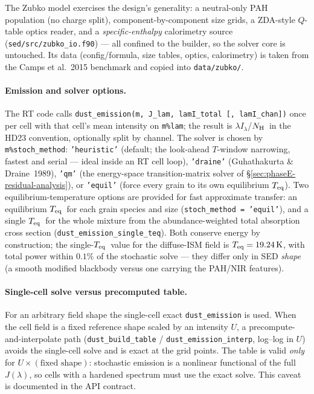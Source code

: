 \documentclass{my_memo}
\newcommand{\Teq}{\ensuremath{T_{\rm eq}}}
\newcommand{\Nh}{\ensuremath{N_{\rm H}}}
\newcommand{\lamIlam}{\ensuremath{\lambda I_\lambda}}
\begin{document}
\noindent The Zubko model exercises the design's generality: a neutral-only
PAH population (no charge split), component-by-component size grids, a ZDA-style
$Q$-table optics reader, and a \emph{specific-enthalpy} calorimetry source
(\texttt{sed/src/zubko\_io.f90}) --- all confined to the builder, so the
solver core is untouched. Its data (config/formula, size tables, optics,
calorimetry) is taken from the Camps et al.~2015 benchmark and copied into
\texttt{data/zubko/}.

\paragraph{Emission and solver options.} The RT code calls
\texttt{dust\_emission(m, J\_lam, lamI\_total [, lamI\_chan])} once per
cell with that cell's mean intensity on \texttt{m\%lam}; the result is
\lamIlam/\Nh\ in the HD23 convention, optionally split by channel. The
solver is chosen by \texttt{m\%stoch\_method}: \texttt{'heuristic'}
(default; the look-ahead $T$-window narrowing, fastest and
serial --- ideal inside an RT cell loop), \texttt{'draine'}
(Guhathakurta \& Draine~1989), \texttt{'qm'} (the energy-space
transition-matrix solver of \S\ref{sec:phaseE-residual-analysis}), or
\texttt{'equil'} (force every grain to its own equilibrium \Teq). Two
equilibrium-temperature options are provided for fast approximate
transfer: an equilibrium \Teq\ for each grain species and size
(\texttt{stoch\_method = 'equil'}), and a single \Teq\ for the whole mixture from the
abundance-weighted total absorption cross section
(\texttt{dust\_emission\_single\_teq}). Both conserve energy by
construction; the single-\Teq\ value for the diffuse-ISM field is
$\Teq = \SI{19.24}{\kelvin}$, with total power within $0.1\%$ of the
stochastic solve --- they differ only in SED \emph{shape} (a smooth
modified blackbody versus one carrying the PAH/NIR features).

\paragraph{Single-cell solve versus precomputed table.} For an arbitrary
field shape the single-cell exact \texttt{dust\_emission} is used. When the
cell field is a fixed reference shape scaled by an intensity $U$, a
precompute-and-interpolate path (\texttt{dust\_build\_table} /
\texttt{dust\_emission\_interp}, log--log in $U$) avoids the single-cell
solve and is exact at the grid points. The table is valid \emph{only}
for $U\times(\text{fixed shape})$: stochastic emission is a nonlinear
functional of the full $J(\lambda)$, so cells with a hardened spectrum
must use the exact solve. This caveat is documented in the API contract.
\end{document}
